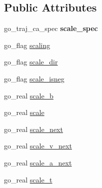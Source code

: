\subsection*{Public Attributes}
\begin{DoxyCompactItemize}
\item 
\hypertarget{structgomotion_1_1go__scale__spec_a09627b5c232ccc27aa4a9876c7fd6edb}{go\-\_\-traj\-\_\-ca\-\_\-spec {\bfseries scale\-\_\-spec}}\label{structgomotion_1_1go__scale__spec_a09627b5c232ccc27aa4a9876c7fd6edb}

\item 
go\-\_\-flag \hyperlink{structgomotion_1_1go__scale__spec_ab692a7752aa08649020c990b4bea3c84}{scaling}
\item 
go\-\_\-flag \hyperlink{structgomotion_1_1go__scale__spec_af13cc2a23a17aba5aae5fbafc47a8428}{scale\-\_\-dir}
\item 
go\-\_\-flag \hyperlink{structgomotion_1_1go__scale__spec_abd719098dc45e827d7349e8eb682f2c2}{scale\-\_\-isneg}
\item 
go\-\_\-real \hyperlink{structgomotion_1_1go__scale__spec_ac734b7e45bc1da45992fdf6f1fdc792d}{scale\-\_\-b}
\item 
go\-\_\-real \hyperlink{structgomotion_1_1go__scale__spec_a592f5bd1c5d775d30e25b798900a2c30}{scale}
\item 
go\-\_\-real \hyperlink{structgomotion_1_1go__scale__spec_ab141b03f6bb455d94cbeebf6c9de5cc3}{scale\-\_\-next}
\item 
go\-\_\-real \hyperlink{structgomotion_1_1go__scale__spec_a72b34038e403e2efffd083765389c5f2}{scale\-\_\-v\-\_\-next}
\item 
go\-\_\-real \hyperlink{structgomotion_1_1go__scale__spec_a1786056a5451cb1841cf42f23f079c61}{scale\-\_\-a\-\_\-next}
\item 
go\-\_\-real \hyperlink{structgomotion_1_1go__scale__spec_a7496e98c2084abd59d74c803b1d7dbec}{scale\-\_\-t}
\end{DoxyCompactItemize}


